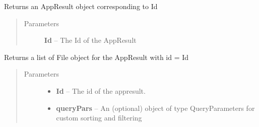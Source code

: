 \documentclass[letterpaper,10pt,english]{sphinxmanual}
\begin{document}
\begin{fulllineitems}
\begin{fulllineitems}
\begin{quote}
\begin{description}
\begin{itemize}
\end{itemize}

\end{description}\end{quote}

\end{fulllineitems}


\begin{fulllineitems}
\label{Available modules:BaseSpacePy.api.BaseSpaceAPI.BaseSpaceAPI.getAppResultById}
Returns an AppResult object corresponding to Id
\begin{quote}\begin{description}
\item[{Parameters}] \leavevmode
\textbf{Id} -- The Id of the AppResult

\end{description}\end{quote}

\end{fulllineitems}


\begin{fulllineitems}
\label{Available modules:BaseSpacePy.api.BaseSpaceAPI.BaseSpaceAPI.getAppResultFiles}
Returns a list of File object for the AppResult with id  = Id
\begin{quote}\begin{description}
\item[{Parameters}] \leavevmode\begin{itemize}
\item {} 
\textbf{Id} -- The id of the appresult.

\item {} 
\textbf{queryPars} -- An (optional) object of type QueryParameters for custom sorting and filtering

\end{itemize}

\end{description}\end{quote}

\end{fulllineitems}


\end{fulllineitems}
\end{document}
